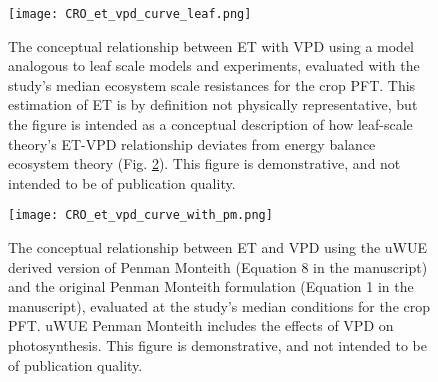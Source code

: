 \documentclass[12pt]{article}
\begin{document}
\begin{figure}
  \centering \texttt{[image: CRO\_et\_vpd\_curve\_leaf.png]}
  \caption{The conceptual relationship between ET with VPD using a
    model analogous to leaf scale models and experiments, evaluated
    with the study's median ecosystem scale resistances for the crop
    PFT. This estimation of ET is by definition not physically
    representative, but the figure is intended as a conceptual
    description of how leaf-scale theory's ET-VPD relationship deviates
    from energy balance ecosystem theory (Fig. \ref{PM}). This figure is
    demonstrative, and not intended to be of publication quality.}
  \label{leaf}
\end{figure}

\begin{figure}
  \centering \texttt{[image: CRO\_et\_vpd\_curve\_with\_pm.png]}
  \caption{The conceptual relationship between ET and VPD using the
    uWUE derived version of Penman Monteith (Equation 8 in the manuscript)
    and the original Penman Monteith formulation (Equation 1 in the
    manuscript), evaluated at the study's median conditions for the
    crop PFT. uWUE Penman Monteith includes the effects of VPD on
    photosynthesis. This figure is demonstrative, and not intended to be of
    publication quality.}
  \label{PM}
\end{figure}
\end{document}
